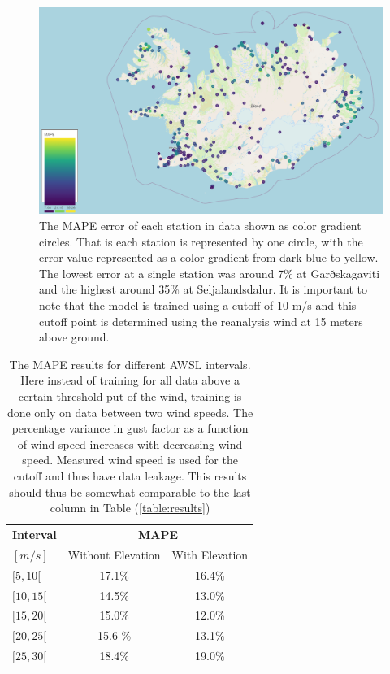 \begin{figure}[h]
    \centering
    \includegraphics[scale = 0.5]{Figures/errorMap.png}
    \caption[MAPE error distribution of stations shown on a map of Iceland.]{The MAPE error of each station in data shown as color gradient circles. That is each station is represented by one circle, with the error value represented as a color gradient from dark blue to yellow. The lowest error at a single station was around 7\% at Garðskagaviti and the highest around 35\% at Seljalandsdalur. It is important to note that the model is trained using a cutoff of 10 m/s and this cutoff point is determined using the reanalysis wind at 15 meters above ground.}
    \label{fig:errorMap}
\end{figure}

\begin{table}[h]
    \caption[Model result looking at closed wind speed intervals]{The MAPE results for different AWSL intervals. Here instead of training for all data above a certain threshold put of the wind, training is done only on data between two wind speeds. The percentage variance in gust factor as a function of wind speed increases with decreasing wind speed. Measured wind speed is used for the cutoff and thus have data leakage. This results should thus be somewhat comparable to the last column in Table (\ref{table:results})}
    \label{table:closed_intervals}
    \centering
    \begin{tabular}{lcc}
        \toprule
        \textbf{Interval} &  \multicolumn{2}{c}{\textbf{MAPE}}\\
        $[m/s]$ & Without Elevation & With Elevation\\
        \midrule
        $[5, 10[$ & 17.1\% & 16.4\%\\
        $[10, 15[$ & 14.5\% & 13.0\%\\
        $[15, 20[$ & 15.0\% & 12.0\%\\
        $[20, 25[$ & 15.6 \% & 13.1\%\\
        $[25, 30[$ & 18.4\% & 19.0\%\\
        \bottomrule
    \end{tabular}
\end{table}

